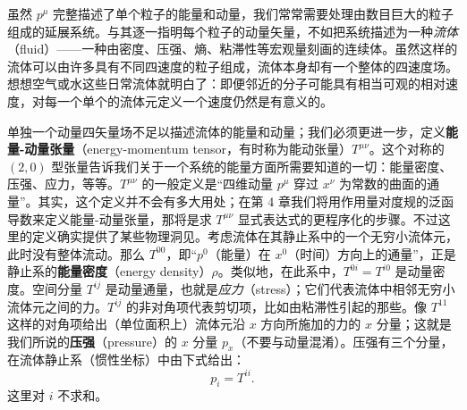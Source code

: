 虽然 $p^{\mu}$ 完整描述了单个粒子的能量和动量，我们常常需要处理由数目巨大的粒子组成的延展系统。与其逐一指明每个粒子的动量矢量，不如把系统描述为一种\emph{流体}（fluid）——一种由密度、压强、熵、粘滞性等宏观量刻画的连续体。虽然这样的流体可以由许多具有不同四速度的粒子组成，流体本身却有一个整体的四速度场。想想空气或水这些日常流体就明白了：即便邻近的分子可能具有相当可观的相对速度，对每一个单个的流体元定义一个速度仍然是有意义的。

单独一个动量四矢量场不足以描述流体的能量和动量；我们必须更进一步，定义\textbf{能量-动量张量}（energy-momentum tensor，有时称为能动张量）$T^{\mu\nu}$。这个对称的 $(2,0)$ 型张量告诉我们关于一个系统的能量方面所需要知道的一切：能量密度、压强、应力，等等。$T^{\mu\nu}$ 的一般定义是“四维动量 $p^{\mu}$ 穿过 $x^{\nu}$ 为常数的曲面的通量”。其实，这个定义并不会有多大用处；在第 4 章我们将用作用量对度规的泛函导数来定义能量-动量张量，那将是求 $T^{\mu\nu}$ 显式表达式的更程序化的步骤。不过这里的定义确实提供了某些物理洞见。考虑流体在其静止系中的一个无穷小流体元，此时没有整体流动。那么 $T^{00}$，即“$p^{0}$（能量）在 $x^{0}$（时间）方向上的通量”，正是静止系的\textbf{能量密度}（energy density）$\rho$。类似地，在此系中，$T^{0i}=T^{i0}$ 是动量密度。空间分量 $T^{ij}$ 是动量通量，也就是\emph{应力}（stress）；它们代表流体中相邻无穷小流体元之间的力。$T^{ij}$ 的非对角项代表剪切项，比如由粘滞性引起的那些。像 $T^{11}$ 这样的对角项给出（单位面积上）流体元沿 $x$ 方向所施加的力的 $x$ 分量；这就是我们所说的\textbf{压强}（pressure）的 $x$ 分量 $p_{x}$（不要与动量混淆）。压强有三个分量，在流体静止系（惯性坐标）中由下式给出：
\begin{equation*}
p_i = T^{ii}.
\tag{1.107}
\end{equation*}
这里对 $i$ 不求和。


